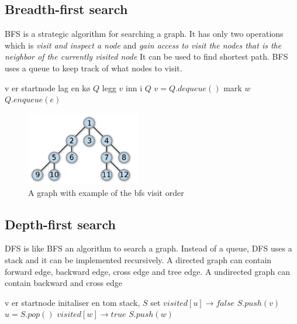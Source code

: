 \documentclass[a4paper, 10pt]{article}
\begin{document}
\subsection{Breadth-first search}
BFS is a strategic algorithm for searching a graph. It has only two operations which is \textit{visit and inspect a node} and \textit{gain access to visit the nodes that is the neighbor of the currently visited node}
It can be used to find shortest path. 
BFS uses a queue to keep track of what nodes to visit.
\\
\begin{algorithmic}
 \Comment v er startnode 
        \State lag en kø $Q$
        \State legg $v$ inn i $Q$
                \State $v = Q.dequeue()$
                                \State mark $w$
                                \State $Q.enqueue(e)$
                        \EndIf
                \EndFor
        \EndWhile
\EndFunction

\begin{figure}[hbt]
    \begin{center}
        \includegraphics[width=5cm] {img/bfs.png}
	\caption{A graph with example of the bfs visit order}
    \end{center}
\end{figure}

\subsection{Depth-first search}
DFS is like BFS an algorithm to search a graph. Instead of a queue, DFS uses a stack and it can be implemented recursively.
A directed graph can contain forward edge, backward edge, cross edge and tree edge.
A undirected graph can contain backward and cross edge
\\

\begin{algorithmic}
 \Comment v er startnode
        \State initaliser en tom stack, $S$
        \State set $visited[u] \rightarrow false$
        \EndFor 
        \State $S.push(v)$
                \State $u = S.pop()$
                                \State $visited[w] \rightarrow true$
                                \State $S.push(w)$
                        \EndIf
                \EndFor
        \EndWhile
\EndFunction
\end{algorithmic}


\end{algorithmic}
\end{document}
